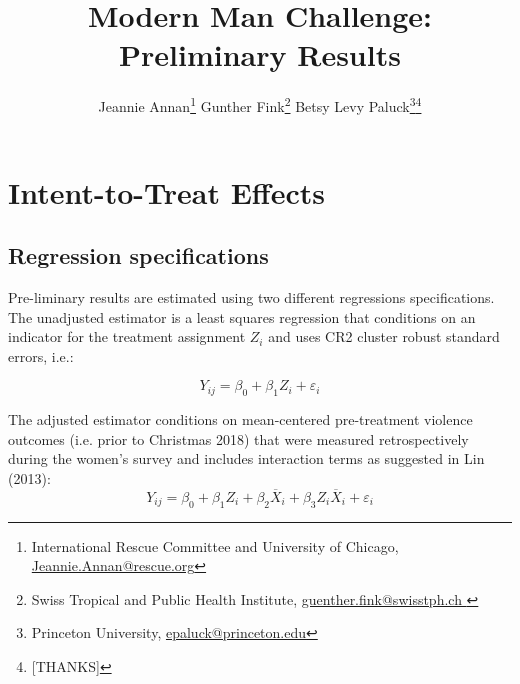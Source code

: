 \documentclass[11pt,english]{article}
\begin{document}
\title{Modern Man Challenge: Preliminary Results}

\author{
  Jeannie Annan\footnote{International Rescue Committee and University of Chicago, \href{Jeannie.Annan@rescue.org}{Jeannie.Annan@rescue.org}} \quad  
  Gunther Fink\footnote{Swiss Tropical and Public Health Institute, \href{guenther.fink@swisstph.ch }{guenther.fink@swisstph.ch }} \quad  
  Betsy Levy Paluck\footnote{Princeton University, \href{epaluck@princeton.edu}{epaluck@princeton.edu}}\thanks{
  [THANKS]
  } 
}


\maketitle




\clearpage

\tableofcontents

\newpage

\listoftables

\newpage

\setcounter{page}{1}

\doublespacing 

\section{Intent-to-Treat Effects}

\subsection{Regression specifications}

Pre-liminary results are estimated using two different regressions specifications. The unadjusted estimator is a least squares regression that conditions on an indicator for the treatment assignment $Z_i$ and uses CR2 cluster robust standard errors, i.e.:

\[Y_{ij} = \beta_0 + \beta_1 Z_i + \varepsilon_i \]

The adjusted estimator conditions on mean-centered pre-treatment violence outcomes (i.e. prior to Christmas 2018) that were measured retrospectively during the women's survey and includes interaction terms as suggested in Lin (2013):
\[Y_{ij} = \beta_0 + \beta_1 Z_i + \beta_2 \overline{X}_i + \beta_3 Z_i \overline{X}_i + \varepsilon_i\]
\end{document}

